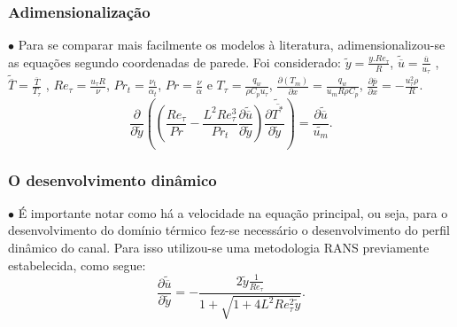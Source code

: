 \documentclass[xcolor=dvipsnames,10pt,aspectratio=169]{beamer}
\begin{document}
		
		
		
	
	
	
	
	
	
		\begin{frame}
			\frametitle{Adimensionalização}
			$\bullet$ Para se comparar mais facilmente os modelos à literatura, adimensionalizou-se as equações segundo coordenadas de parede. Foi considerado: $ \tilde{y} = \frac{y . Re_\tau}{R} $, $ \tilde{\overline{u}} = \frac{\overline{u}}{u_\tau} $ , $ \tilde{\overline{T}} = \frac{\overline{T}}{T_\tau} $ , $Re_\tau = \frac{u_\tau R}{\nu}$, $Pr_t = \frac{\nu_t}{\alpha_t}$, $Pr = \frac{\nu}{\alpha}$ e $T_\tau = \frac{q_w}{\rho C_p u_\tau}$, $\frac{\partial{\left(T_m\right)}}{\partial{x}} = \frac{q_w}{u_m  R \rho  C_p } $, $\frac{\partial \overline{p}}{\partial x} = - \frac{u_\tau^2 \rho}{R} $.
			\\
				\begin{equation}
				{\frac{\partial{}}{\partial{\tilde{y}}}} \left( \left( \frac{Re_\tau}{Pr}   
				- \frac{{L}^2 Re_\tau ^3}{Pr_t}\frac{\partial \tilde{\overline{u}}}{\partial \tilde{y}} \right) \frac{\partial \tilde{\overline{T^\ast}}}{\partial \tilde{y}} \right)
				= 
				\frac{\partial\tilde{\overline{u}}}{\tilde{u_m}}.
				\end{equation}
		\end{frame}
	
	
	
		\begin{frame}
			\frametitle{O desenvolvimento dinâmico}
			$\bullet$ É importante notar como há a velocidade na equação principal, ou seja, para o desenvolvimento do domínio térmico fez-se necessário o desenvolvimento do perfil dinâmico do canal. Para isso utilizou-se uma metodologia RANS previamente estabelecida, como segue: 
				\begin{equation}
				\frac{\partial \tilde{\overline{u}}}{\partial \tilde{y}} = - \frac{2 \tilde{y} \frac{1}{Re_\tau} }{ 1 + \sqrt{ 1 + 4 L ^2 Re_\tau ^2 \tilde{y}}}.
				\end{equation}	
		\end{frame}
	
\end{document}
